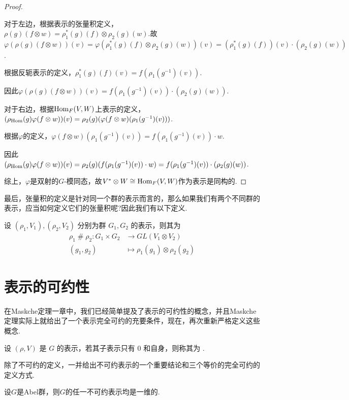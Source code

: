 \begin{proof}
\begin{enumerate}[label=(\roman*),leftmargin=3.5em]
        对于左边，根据表示的张量积定义，$\rho(g)(f \otimes w) = \rho_1^*(g)(f) \otimes \rho_2(g)(w)$.故$\varphi(\rho(g)(f \otimes w))(v) = \varphi(\rho_1^*(g)(f) \otimes \rho_2(g)(w))(v) = (\rho_1^*(g)(f))(v) \cdot (\rho_2(g)(w))$.\par
        根据反轭表示的定义，$\rho_1^*(g)(f)(v) = f(\rho_1(g^{-1})(v))$.\par
        因此$\varphi(\rho(g)(f \otimes w))(v)=f(\rho_1(g^{-1})(v)) \cdot (\rho_2(g)(w))$.\par
        对于右边，根据$\operatorname{Hom}_F(V,W)$上表示的定义，$(\rho_{\operatorname{Hom}}(g)\varphi(f \otimes w))(v) = \rho_2(g)(\varphi(f \otimes w)(\rho_1(g^{-1})(v)))$.\par
        根据$\varphi$的定义，$\varphi(f \otimes w)(\rho_1(g^{-1})(v)) = f(\rho_1(g^{-1})(v)) \cdot w$.\par
        因此$(\rho_{\operatorname{Hom}}(g)\varphi(f \otimes w))(v) = \rho_2(g)(f(\rho_1(g^{-1})(v)) \cdot w) = f(\rho_1(g^{-1})(v)) \cdot (\rho_2(g)(w))$.\par
    \end{enumerate}

    综上，$\varphi$是双射的$G$-模同态，故$V^*\otimes W\cong \operatorname{Hom}_F(V,W)$作为表示是同构的.
\end{proof}

最后，张量积的定义是针对同一个群的表示而言的，那么如果我们有两个不同群的表示，应当如何定义它们的张量积呢?因此我们有以下定义.

\begin{definition}
    设 $(\rho_1, V_1), (\rho_2, V_2)$ 分别为群 $G_1, G_2$ 的表示，则其为 \begin{align*}
        \rho_1 \mathbin{\#} \rho_2 \colon G_1 \times G_2 &\to GL(V_1 \otimes V_2) \\
        (g_1, g_2) &\mapsto \rho_1(g_1) \otimes \rho_2(g_2)
    \end{align*}
\end{definition}



\section{表示的可约性}

在Maskche定理一章中，我们已经简单提及了表示的可约性的概念，并且Maskche定理实际上就给出了一个表示完全可约的充要条件，现在，再次重新严格定义这些概念.

\begin{definition}
    设 $(\rho, V)$ 是 $G$ 的表示，若其子表示只有 $0$ 和自身，则称其为 .
\end{definition}
除了不可约的定义，一并给出不可约表示的一个重要结论和三个等价的完全可约的定义方式.
\begin{lemma}[]
    设$G$是Abel群，则$G$的任一不可约表示均是一维的.
\end{lemma}


